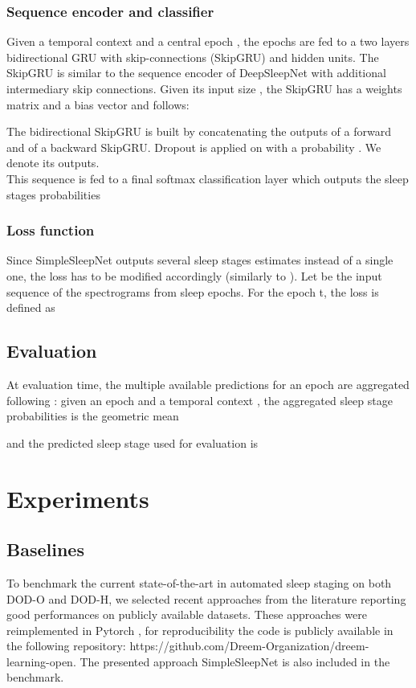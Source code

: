 \documentclass[journal]{IEEEtran}
\begin{document}
\subsubsection{Sequence encoder and classifier}
Given a temporal context  and a central epoch , the epochs  are fed to a two layers bidirectional GRU with skip-connections (SkipGRU) and  hidden units.
The SkipGRU is similar to the sequence encoder of DeepSleepNet \cite{Supratak2017} with additional intermediary skip connections. Given its input size , the SkipGRU has a weights matrix  and a bias vector  and follows:
 
The bidirectional SkipGRU is built by concatenating the outputs of a forward and of a backward SkipGRU. Dropout is applied on  with a probability . We denote  its outputs.\\
This sequence is fed to a final softmax classification layer which outputs the sleep stages probabilities  

\subsubsection{Loss function}
Since SimpleSleepNet outputs several sleep stages estimates instead of a single one, the loss has to be modified accordingly (similarly to \cite{Phan2019}). Let  be the input sequence of the spectrograms from  sleep epochs. For the epoch t, the loss is defined as 

\subsection{Evaluation}  \label{section_evaluation}
At evaluation time, the multiple available predictions for an epoch are aggregated following \cite{Phan2019}: given an epoch  and a temporal context , the aggregated sleep stage probabilities is the geometric mean 

and the predicted sleep stage used for evaluation is 
 
\section{Experiments}

\subsection{Baselines}
\label{sec:baseline}

To benchmark the current state-of-the-art in automated sleep staging on both DOD-O and DOD-H, we selected recent approaches from the literature reporting good performances on publicly available datasets. These approaches were reimplemented in Pytorch \cite{paszke2017automatic}, for reproducibility the code is publicly available in the following repository: https://github.com/Dreem-Organization/dreem-learning-open. The presented approach SimpleSleepNet is also included in the benchmark.
\end{document}
